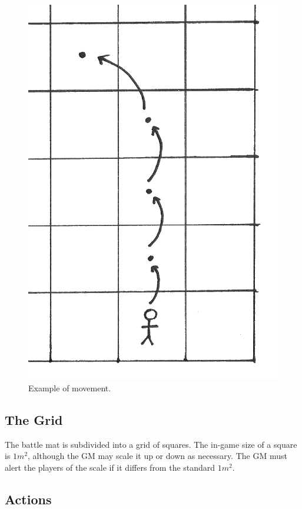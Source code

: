 \begin{figure}
    \centering
    \includegraphics{graphics/movement-trans.png}
    \caption{Example of movement.}
    \label{fig:movement}
\end{figure}

\subsection{The Grid}
The battle mat is subdivided into a grid of squares. 
The in-game size of a square is $1m^2$, although the GM may scale it up or down as necessary.
The GM must alert the players of the scale if it differs from the standard $1m^2$.

\subsection{Actions}

